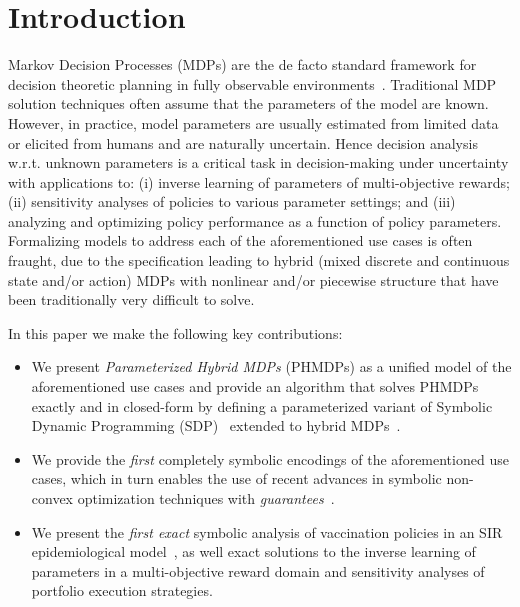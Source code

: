 \documentclass[letterpaper]{article}
\begin{document}

\section{Introduction}
\label{sec:introduction}

Markov Decision Processes (MDPs) are the de facto standard framework for decision theoretic planning in fully observable environments~\cite{Boutilier_JAIR_1999}. Traditional MDP solution techniques often assume that the parameters of the model are known. However, in practice, model parameters are usually estimated from limited data or elicited from humans and are naturally uncertain. Hence decision analysis w.r.t. unknown parameters is a critical task in decision-making under uncertainty with applications to: (i) inverse learning of parameters of multi-objective rewards; (ii) sensitivity analyses of policies to various parameter settings; and (iii) analyzing and optimizing policy performance as a function of policy parameters. Formalizing models to address each of the aforementioned use cases is often fraught, due to the specification leading to hybrid (mixed discrete and continuous state and/or action) MDPs with nonlinear and/or piecewise structure that have been traditionally very difficult to solve.

In this paper we make the following key contributions:
\begin{itemize}
    \item We present {\it Parameterized Hybrid MDPs} (PHMDPs) as a unified model of the aforementioned use cases and provide an algorithm that solves PHMDPs exactly and in closed-form by defining a parameterized variant of Symbolic Dynamic Programming (SDP)~\cite{Boutilier_IJCAI_2001} extended to hybrid MDPs~\cite{Sanner_UAI_2011}. 
    \item We provide the \textit{first} completely symbolic encodings of the aforementioned use cases, which in turn enables the use of recent advances in symbolic non-convex optimization techniques with \textit{guarantees}~\cite{Gao2013}.
    \item We present the \textit{first exact} symbolic analysis of vaccination policies in an SIR epidemiological model~\cite{KermackMcKendrick_1927}, as well exact solutions to the inverse learning of parameters in a multi-objective reward domain and sensitivity analyses of portfolio execution strategies.
\end{itemize}
\end{document}
